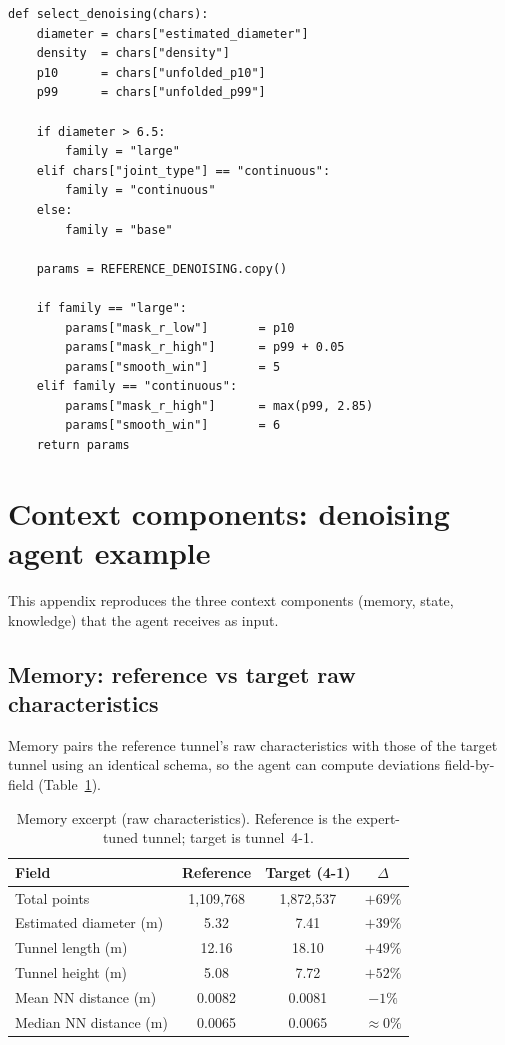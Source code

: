 \pagebreak[4]
\begin{verbatim}
def select_denoising(chars):
    diameter = chars["estimated_diameter"]
    density  = chars["density"]
    p10      = chars["unfolded_p10"]
    p99      = chars["unfolded_p99"]

    if diameter > 6.5:
        family = "large"          
    elif chars["joint_type"] == "continuous":
        family = "continuous"     
    else:
        family = "base"           

    params = REFERENCE_DENOISING.copy()

    if family == "large":
        params["mask_r_low"]       = p10
        params["mask_r_high"]      = p99 + 0.05
        params["smooth_win"]       = 5
    elif family == "continuous":
        params["mask_r_high"]      = max(p99, 2.85)
        params["smooth_win"]       = 6
    return params
\end{verbatim}

\section{Context components: denoising agent example}\label{app:context}

This appendix reproduces the three context components (memory, state, knowledge) that the agent receives as input.

\subsection{Memory: reference vs target raw characteristics}\label{app:context-memory}
Memory pairs the reference tunnel's raw characteristics with those of the target tunnel using an identical schema, so the agent can compute deviations field-by-field (Table~\ref{tab:context-memory}).

\begin{table}[ht]
\caption{Memory excerpt (raw characteristics). Reference is the expert-tuned tunnel; target is tunnel~4-1.}\label{tab:context-memory}
\begin{tabular*}{\tblwidth}{@{} l c c c @{}}
\toprule
Field & Reference & Target (4-1) & $\Delta$ \\
\midrule
Total points & 1{,}109{,}768 & 1{,}872{,}537 & $+69\%$ \\
Estimated diameter (m) & 5.32 & 7.41 & $+39\%$ \\
Tunnel length (m) & 12.16 & 18.10 & $+49\%$ \\
Tunnel height (m) & 5.08 & 7.72 & $+52\%$ \\
Mean NN distance (m) & 0.0082 & 0.0081 & $-1\%$ \\
Median NN distance (m) & 0.0065 & 0.0065 & $\approx 0\%$ \\
\bottomrule
\end{tabular*}
\end{table}

